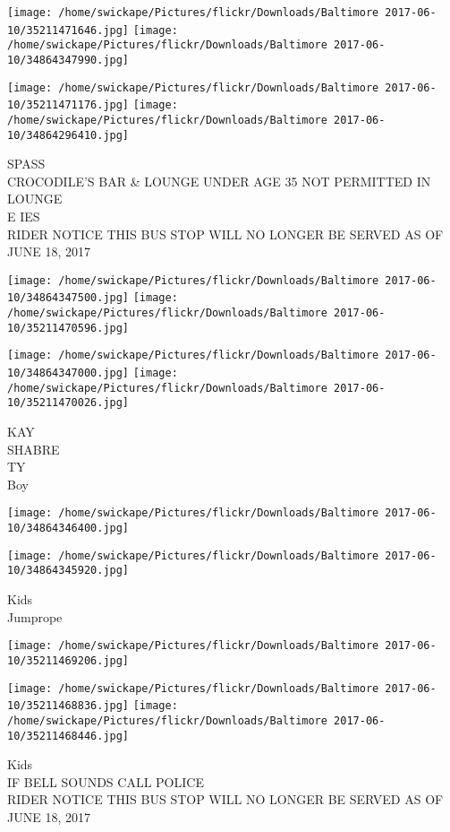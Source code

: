 \documentclass[10pt,letterpaper]{article}
\begin{document}
\texttt{[image: /home/swickape/Pictures/flickr/Downloads/Baltimore 2017-06-10/35211471646.jpg]}
\texttt{[image: /home/swickape/Pictures/flickr/Downloads/Baltimore 2017-06-10/34864347990.jpg]}

\texttt{[image: /home/swickape/Pictures/flickr/Downloads/Baltimore 2017-06-10/35211471176.jpg]}
\texttt{[image: /home/swickape/Pictures/flickr/Downloads/Baltimore 2017-06-10/34864296410.jpg]}

SPASS\\
CROCODILE'S BAR \& LOUNGE UNDER AGE 35 NOT PERMITTED IN LOUNGE\\
E IES\\
RIDER NOTICE THIS BUS STOP WILL NO LONGER BE SERVED AS OF JUNE 18, 2017
\pagebreak

\texttt{[image: /home/swickape/Pictures/flickr/Downloads/Baltimore 2017-06-10/34864347500.jpg]}
\texttt{[image: /home/swickape/Pictures/flickr/Downloads/Baltimore 2017-06-10/35211470596.jpg]}

\texttt{[image: /home/swickape/Pictures/flickr/Downloads/Baltimore 2017-06-10/34864347000.jpg]}
\texttt{[image: /home/swickape/Pictures/flickr/Downloads/Baltimore 2017-06-10/35211470026.jpg]}

KAY\\
SHABRE\\
TY\\
Boy
\pagebreak

\texttt{[image: /home/swickape/Pictures/flickr/Downloads/Baltimore 2017-06-10/34864346400.jpg]}

\vspace{0.25in}
\texttt{[image: /home/swickape/Pictures/flickr/Downloads/Baltimore 2017-06-10/34864345920.jpg]}

Kids\\
Jumprope
\pagebreak

\texttt{[image: /home/swickape/Pictures/flickr/Downloads/Baltimore 2017-06-10/35211469206.jpg]}

\vspace{0.25in}
\texttt{[image: /home/swickape/Pictures/flickr/Downloads/Baltimore 2017-06-10/35211468836.jpg]}
\texttt{[image: /home/swickape/Pictures/flickr/Downloads/Baltimore 2017-06-10/35211468446.jpg]}

Kids\\
IF BELL SOUNDS CALL POLICE\\
RIDER NOTICE THIS BUS STOP WILL NO LONGER BE SERVED AS OF JUNE 18, 2017
\pagebreak
\end{document}
